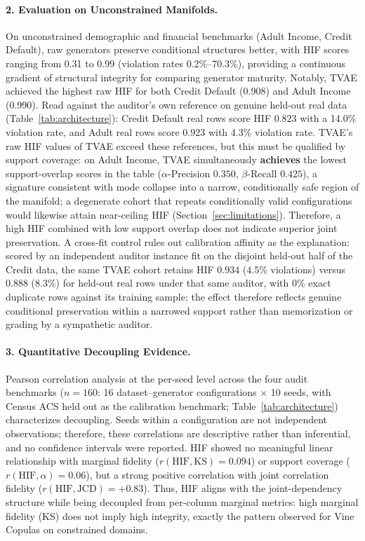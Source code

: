 \documentclass[pdflatex,sn-mathphys-num]{sn-jnl}
\theoremstyle{thmstyleone}%
\theoremstyle{thmstyletwo}%
\theoremstyle{thmstylethree}%
\begin{document}
\paragraph{2. Evaluation on Unconstrained Manifolds.} On unconstrained demographic and financial benchmarks (Adult Income, Credit Default), raw generators preserve conditional structures better, with HIF scores ranging from 0.31 to 0.99 (violation rates 0.2\%--70.3\%), providing a continuous gradient of structural integrity for comparing generator maturity. Notably, TVAE achieved the highest raw HIF for both Credit Default (0.908) and Adult Income (0.990). Read against the auditor's own reference on genuine held-out real data (Table~\ref{tab:architecture}): Credit Default real rows score HIF $0.823$ with a 14.0\% violation rate, and Adult real rows score $0.923$ with 4.3\% violation rate. TVAE's raw HIF values of TVAE exceed these references, but this must be qualified by support coverage: on Adult Income, TVAE simultaneously \textbf{achieves} the lowest support-overlap scores in the table ($\alpha$-Precision $0.350$, $\beta$-Recall $0.425$), a signature consistent with mode collapse into a narrow, conditionally safe region of the manifold; a degenerate cohort that repeats conditionally valid configurations would likewise attain near-ceiling HIF (Section~\ref{sec:limitations}). Therefore, a high HIF combined with low support overlap does not indicate superior joint preservation. A cross-fit control rules out calibration affinity as the explanation: scored by an independent auditor instance fit on the disjoint held-out half of the Credit data, the same TVAE cohort retains HIF $0.934$ ($4.5\%$ violations) versus $0.888$ ($8.3\%$) for held-out real rows under that same auditor, with $0\%$ exact duplicate rows against its training sample; the effect therefore reflects genuine conditional preservation within a narrowed support rather than memorization or grading by a sympathetic auditor.

\paragraph{3. Quantitative Decoupling Evidence.} Pearson correlation analysis at the per-seed level across the four audit benchmarks ($n = 160$: 16 dataset--generator configurations $\times$ 10 seeds, with Census ACS held out as the calibration benchmark; Table~\ref{tab:architecture}) characterizes decoupling. Seeds within a configuration are not independent observations; therefore, these correlations are descriptive rather than inferential, and no confidence intervals were reported. HIF showed no meaningful linear relationship with marginal fidelity ($r(\text{HIF}, \text{KS}) = 0.094$) or support coverage ($r(\text{HIF}, \alpha) = 0.06$), but a strong positive correlation with joint correlation fidelity ($r(\text{HIF}, \text{JCD}) = +0.83$). Thus, HIF aligns with the joint-dependency structure while being decoupled from per-column marginal metrics: high marginal fidelity (KS) does not imply high integrity, exactly the pattern observed for Vine Copulas on constrained domains.
\end{document}
